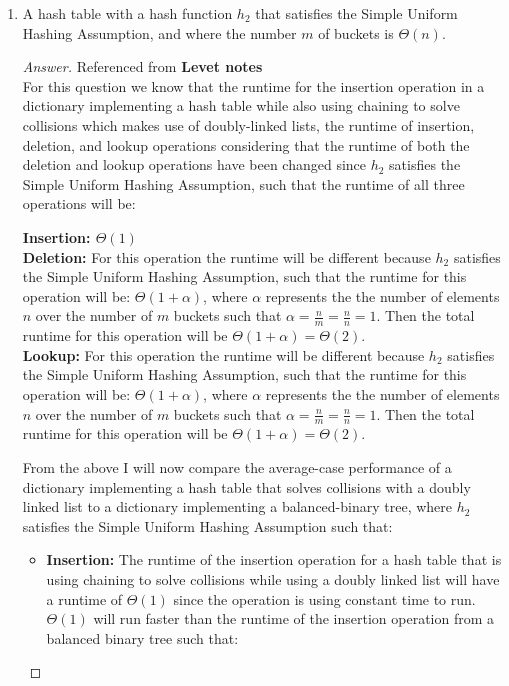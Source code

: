\documentclass[11pt]{article}
\theoremstyle{definition}
\theoremstyle{definition}
\theoremstyle{definition}
\begin{document}
\begin{enumerate}[label=(\alph*)]
    
    \vskip 15pt
    \item A hash table with a hash function $h_2$ that satisfies the Simple Uniform Hashing Assumption, and where the number $m$ of buckets is $\Theta(n)$.
\begin{proof}[Answer] Referenced from \textbf{Levet notes}\\
For this question we know that the runtime for the insertion operation in a dictionary implementing a hash table while also using chaining to solve collisions which makes use of doubly-linked lists, the runtime of insertion, deletion, and lookup operations considering that the runtime of both the deletion and lookup operations have been changed since $h_2$ satisfies the Simple Uniform Hashing Assumption, such that the runtime of all three operations will be:   \\
\begin{center}
\textbf{Insertion: $\Theta(1)$} \\
\textbf{Deletion:} For this operation the runtime will be different because $h_2$ satisfies the Simple Uniform Hashing Assumption, such that the runtime for this operation will be: $\Theta(1+\alpha)$, where $\alpha$ represents the the number of elements $n$ over the number of $m$ buckets such that $\alpha = \frac{n}{m} = \frac{n}{n} = 1$. Then the total runtime for this operation will be $\Theta(1+\alpha) = \Theta(2)$.\\
\textbf{Lookup:} For this operation the runtime will be different because $h_2$ satisfies the Simple Uniform Hashing Assumption, such that the runtime for this operation will be: $\Theta(1+\alpha)$, where $\alpha$ represents the the number of elements $n$ over the number of $m$ buckets such that $\alpha = \frac{n}{m} = \frac{n}{n} = 1$.  Then the total runtime for this operation will be $\Theta(1+\alpha) = \Theta(2)$.
\end{center}
From the above I will now compare the average-case performance of a dictionary implementing a hash table that solves collisions with a doubly linked list to a dictionary implementing a balanced-binary tree, where $h_2$ satisfies the Simple Uniform Hashing Assumption such that: \\
\begin{itemize}
\item \textbf{Insertion:} The runtime of the insertion operation for a hash table that is using chaining to solve collisions while using a doubly linked list will have a runtime of $\Theta(1)$ since the operation is using constant time to run. $\Theta(1)$ will run faster than the runtime of the insertion operation from a balanced binary tree such that: \\

\end{itemize}
\end{proof}
\end{enumerate}
\end{document}

